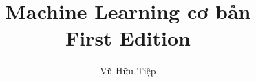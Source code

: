 \documentclass[envcountsame,envcountchap, openany]{mysvmono}
\begin{document}
\author{Vũ Hữu Tiệp}
\title{\bf Machine Learning cơ bản\\
{\small First Edition}}
\maketitle

\frontmatter%

% 
% 
\tableofcontents



\mainmatter%
% 
% 





%
%

\backmatter%
% 
% 
\printindex

\end{document}
